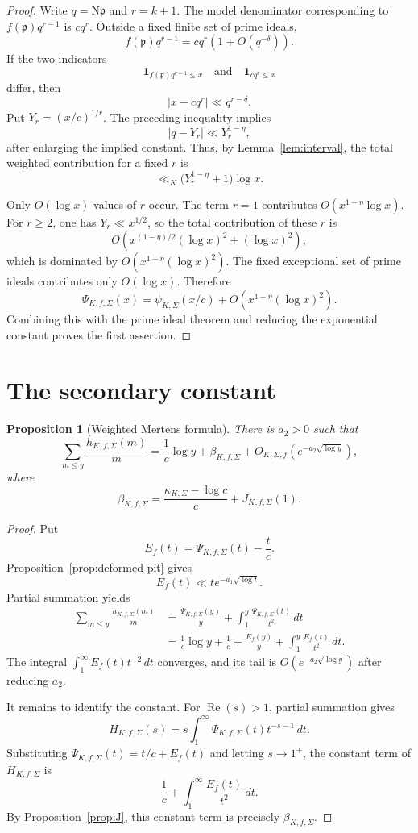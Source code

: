 \documentclass[11pt]{article}
\newtheorem{proposition}[theorem]{Proposition}
\newcommand{\Norm}{\mathrm N}
\newcommand{\RePart}{\operatorname{Re}}
\begin{document}
\begin{proof}
Write \(q=\Norm\mathfrak p\) and \(r=k+1\).  The model denominator
corresponding to
\(f(\mathfrak p)q^{r-1}\) is \(cq^r\).  Outside a fixed finite set of
prime ideals,
\[
f(\mathfrak p)q^{r-1}
=
cq^r(1+O(q^{-\delta})).
\]
If the two indicators
\[
\mathbf 1_{f(\mathfrak p)q^{r-1}\le x}
\quad\text{and}\quad
\mathbf 1_{cq^r\le x}
\]
differ, then
\[
\left|x-cq^r\right|
\ll q^{r-\delta}.
\]
Put \(Y_r=(x/c)^{1/r}\).  The preceding inequality implies
\[
|q-Y_r|
\ll
Y_r^{1-\eta},
\]
after enlarging the implied constant.  Thus, by
Lemma~\ref{lem:interval}, the total weighted contribution for a fixed
\(r\) is
\[
\ll_K
\bigl(Y_r^{1-\eta}+1\bigr)\log x.
\]

Only \(O(\log x)\) values of \(r\) occur.  The term \(r=1\) contributes
\(O(x^{1-\eta}\log x)\).  For \(r\ge2\), one has
\(Y_r\ll x^{1/2}\), so the total contribution of these \(r\) is
\[
O\!\left(
x^{(1-\eta)/2}(\log x)^2
+
(\log x)^2
\right),
\]
which is dominated by
\(O(x^{1-\eta}(\log x)^2)\).  The fixed exceptional set of prime ideals
contributes only \(O(\log x)\).  Therefore
\[
\Psi_{K,f,\Sigma}(x)
=
\psi_{K,\Sigma}(x/c)
+
O\!\left(
x^{1-\eta}(\log x)^2
\right).
\]
Combining this with the prime ideal theorem and reducing the
exponential constant proves the first assertion.
\end{proof}

\section{The secondary constant}
\label{sec:constant}

\begin{proposition}[Weighted Mertens formula]
\label{prop:mertens}
There is \(a_2>0\) such that
\[
\sum_{m\le y}
\frac{h_{K,f,\Sigma}(m)}{m}
=
\frac1c\log y
+
\beta_{K,f,\Sigma}
+
O_{K,\Sigma,f}\!\left(
e^{-a_2\sqrt{\log y}}
\right),
\]
where
\[
\beta_{K,f,\Sigma}
=
\frac{\kappa_{K,\Sigma}-\log c}{c}
+
J_{K,f,\Sigma}(1).
\]
\end{proposition}

\begin{proof}
Put
\[
E_f(t)
=
\Psi_{K,f,\Sigma}(t)-\frac{t}{c}.
\]
Proposition~\ref{prop:deformed-pit} gives
\[
E_f(t)
\ll
t e^{-a_1\sqrt{\log t}}.
\]
Partial summation yields
\begin{align*}
\sum_{m\le y}
\frac{h_{K,f,\Sigma}(m)}{m}
&=
\frac{\Psi_{K,f,\Sigma}(y)}{y}
+
\int_1^y
\frac{\Psi_{K,f,\Sigma}(t)}{t^2}\,dt\\
&=
\frac1c\log y
+
\frac1c
+
\frac{E_f(y)}{y}
+
\int_1^y\frac{E_f(t)}{t^2}\,dt.
\end{align*}
The integral
\(\int_1^\infty E_f(t)t^{-2}\,dt\) converges, and its tail is
\(O(e^{-a_2\sqrt{\log y}})\) after reducing \(a_2\).

It remains to identify the constant.  For \(\RePart(s)>1\),
partial summation gives
\[
H_{K,f,\Sigma}(s)
=
s\int_1^\infty
\Psi_{K,f,\Sigma}(t)t^{-s-1}\,dt.
\]
Substituting
\(\Psi_{K,f,\Sigma}(t)=t/c+E_f(t)\) and letting \(s\to1^+\), the
constant term of \(H_{K,f,\Sigma}\) is
\[
\frac1c+\int_1^\infty\frac{E_f(t)}{t^2}\,dt.
\]
By Proposition~\ref{prop:J}, this constant term is precisely
\(\beta_{K,f,\Sigma}\).
\end{proof}
\end{document}
